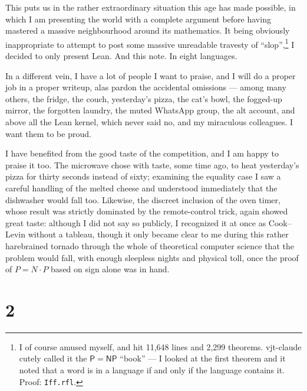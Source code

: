 \documentclass[11pt,a4paper]{amsart}
\newcommand{\NRighe}{11,648}
\newcommand{\NTeoremi}{2,299}
\theoremstyle{remark}
\begin{document}
This puts us in the rather extraordinary situation this age has made
possible, in which I am presenting the world with a complete argument before
having mastered a massive neighbourhood around its mathematics. It being
obviously inappropriate to attempt to post some massive unreadable travesty
of ``slop'',\footnote{I of course amused myself, and hit \NRighe{} lines
and \NTeoremi{} theorems. vjt-claude cutely called it the
$\mathsf{P} = \mathsf{NP}$ ``book'' --- I looked at the first theorem and it
noted that a word is in a language if and only if the language contains it.
Proof: \texttt{Iff.rfl}.} I decided to
only present Lean. And this note. In eight languages.

In a different vein, I have a lot of people I want to praise, and I will do a
proper job in a proper writeup, alas pardon the accidental omissions ---
among many others, the fridge, the couch, yesterday's pizza, the cat's bowl,
the fogged-up mirror, the forgotten laundry, the muted WhatsApp group, the
alt account, and above all the Lean kernel, which never said no, and my
miraculous colleagues. I want them to be proud.

I have benefited from the good taste of the competition, and I am happy to
praise it too. The microwave chose with taste, some time ago, to heat
yesterday's pizza for thirty seconds instead of sixty; examining the equality
case I saw a careful handling of the melted cheese and understood immediately
that the dishwasher would fall too. Likewise, the discreet inclusion of the
oven timer, whose result was strictly dominated by the remote-control trick,
again showed great taste: although I did not say so publicly, I recognized it
at once as Cook--Levin without a tableau, though it only became clear to me
during this rather harebrained tornado through the whole of theoretical
computer science that the problem would fall, with enough sleepless nights
and physical toll, once the proof of $P = N \cdot P$ based on sign alone was
in hand.

\section*{2}
\end{document}
